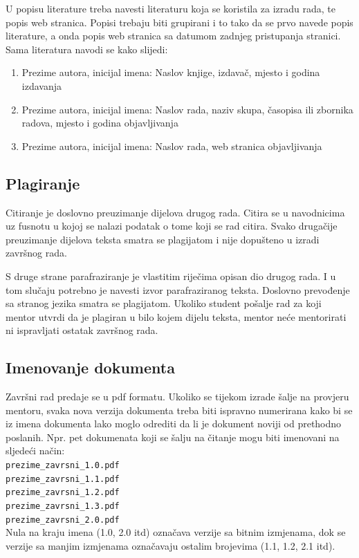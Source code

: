 U popisu literature treba navesti literaturu koja se koristila za izradu rada, te popis web stranica. Popisi trebaju biti 
grupirani i to tako da se prvo navede popis literature, a onda 
popis web stranica sa datumom zadnjeg pristupanja stranici.
Sama literatura navodi se kako slijedi:
\begin{enumerate}
\item 
Prezime autora, inicijal imena: Naslov knjige, izdavač, mjesto i godina izdavanja
\item Prezime autora, inicijal imena: Naslov rada, naziv skupa, časopisa ili zbornika radova,
mjesto i godina objavljivanja
\item Prezime autora, inicijal imena: Naslov rada, web stranica objavljivanja
\end{enumerate}

\subsection{Plagiranje}

Citiranje je doslovno preuzimanje dijelova drugog rada. Citira se u navodnicima uz fusnotu u kojoj se nalazi podatak o tome koji se rad citira. 
Svako drugačije preuzimanje dijelova teksta 
smatra se plagijatom i nije dopušteno u izradi završnog rada. 

S druge strane parafraziranje je vlastitim riječima opisan dio drugog rada. 
I u tom slučaju potrebno je navesti izvor 
parafraziranog teksta. Doslovno prevođenje sa stranog jezika smatra se plagijatom. Ukoliko student pošalje rad za koji mentor utvrdi da je plagiran u bilo kojem dijelu teksta, mentor neće mentorirati ni ispravljati ostatak završnog rada. 

\subsection{Imenovanje dokumenta}

Završni rad predaje se u pdf formatu. Ukoliko se tijekom izrade šalje na provjeru mentoru, svaka nova verzija dokumenta treba biti 
ispravno numerirana kako bi se iz imena 
dokumenta lako moglo odrediti da li je dokument noviji od prethodno poslanih. Npr. pet dokumenata koji se šalju na čitanje mogu biti 
imenovani na sljedeći način:
\\
\texttt{prezime\_zavrsni\_1.0.pdf}\\
\texttt{prezime\_zavrsni\_1.1.pdf}\\
\texttt{prezime\_zavrsni\_1.2.pdf}\\
\texttt{prezime\_zavrsni\_1.3.pdf}\\
\texttt{prezime\_zavrsni\_2.0.pdf}\\
Nula na kraju imena (1.0, 2.0 itd) označava verzije sa bitnim izmjenama, dok se verzije sa manjim izmjenama označavaju ostalim brojevima (1.1, 1.2, 2.1 itd). 

